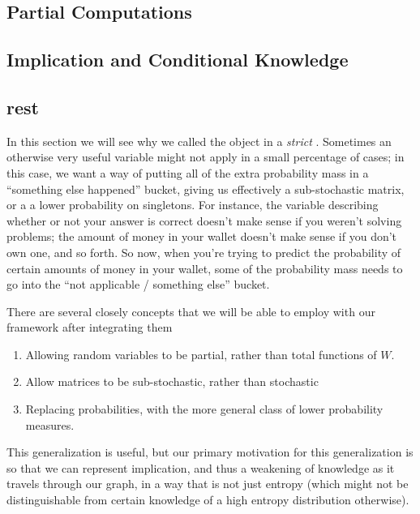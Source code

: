 \subsection{Partial Computations}
\subsection{Implication and Conditional Knowledge}

\subsection*{rest}


In this section we will see why we called the object in  a \textit{strict} \MN.	
Sometimes an otherwise very useful variable might not apply in a small percentage of cases; in this case, we want a way of putting all of the extra probability mass in a ``something else happened'' bucket, giving us effectively a sub-stochastic matrix, or a a lower probability on singletons. For instance, the variable describing whether or not your answer is correct doesn't make sense if you weren't solving problems; the amount of money in your wallet doesn't make sense if you don't own one, and so forth. So now, when you're trying to predict the probability of certain amounts of money in your wallet, some of the probability mass needs to go into the ``not applicable / something else'' bucket. 

There are several closely concepts that we will be able to employ with our framework after integrating them
\begin{enumerate}[nosep]
	\item Allowing random variables to be partial, rather than total functions of $W$. 
	\item Allow matrices to be sub-stochastic, rather than stochastic
	\item Replacing probabilities, with the more general class of lower probability measures.
\end{enumerate}

This generalization is useful, but our primary motivation for this generalization is so that we can represent implication, and thus a weakening of knowledge as it travels through our graph, in a way that is not just entropy (which might not be distinguishable from certain knowledge of a high entropy distribution otherwise). 

